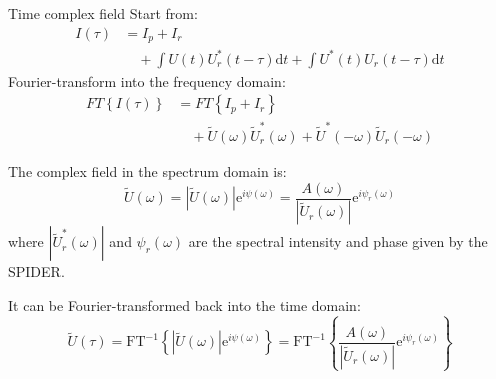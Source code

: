 \documentclass[11pt]{beamer}
\begin{document}
\begin{frame}{Time complex field}
Start from:
\begin{align}
	I(\tau) 	&= I_p + I_r \nonumber\\
			&\quad+ \int U(t)U_r^*(t-\tau)\mathrm{d}t + \int U^*(t)U_r(t-\tau)\mathrm{d}t 
	\label{eq_inter}
\end{align}
Fourier-transform into the frequency domain:
\begin{align}
FT\left\lbrace I(\tau)\right\rbrace 	&= 	FT\left\lbrace I_p + I_r \right\rbrace \nonumber\\
&\quad+ \tilde{U}(\omega)\tilde{U}_r^*(\omega) + \tilde{U}^*(-\omega)\tilde{U}_r(-\omega)
	\label{eq_fourier}
\end{align}
\end{frame}
\begin{frame}
The complex field in the spectrum domain is:
\begin{equation}
\tilde{U}(\omega) = |\tilde{U}(\omega)|\mathrm{e}^{i\psi(\omega)} = \frac{A(\omega)}{|\tilde{U}_r(\omega)|}\mathrm{e}^{i\psi_r(\omega)}
	\label{eq_field_spectral}
\end{equation}
where $|\tilde{U}_r^*(\omega)|$ and $\psi_r(\omega)$ are the spectral intensity and phase given by the SPIDER.

\vspace{15pt}
It can be Fourier-transformed back into the time domain:
\begin{equation}
\tilde{U}(\tau) = \mathrm{FT}^{-1} \left\lbrace |\tilde{U}(\omega)|\mathrm{e}^{i\psi(\omega)} \right\rbrace
= \mathrm{FT}^{-1} \left\lbrace \frac{A(\omega)}{|\tilde{U}_r(\omega)|}\mathrm{e}^{i\psi_r(\omega)} \right\rbrace
	\label{eq_field}
\end{equation}
\end{frame}
\end{document}
